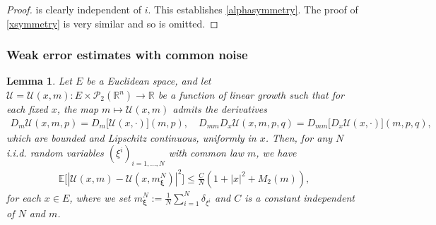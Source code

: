 \documentclass[11pt,reqno]{amsart}
\numberwithin{equation}{section}
\newtheorem{lemma}[theorem]{Lemma}
\theoremstyle{definition}
\def\E{{\mathbb E}}
\def\R{{\mathbb R}}
\newcommand{\sP}{\mathcal{P}}
\newcommand\cU{\mathcal U}
\def \E{\mathbb{E}}
\def \R{\mathbb{R}}
\begin{document}
\begin{proof}
is clearly independent of $i$.
 This establishes \eqref{alphasymmetry}. The proof of \eqref{xsymmetry} is very similar and so is omitted. 
\end{proof}



\subsubsection{Weak error estimates with common noise}

\begin{lemma} \label{lem:errorterms}
  Let $E$ be a Euclidean space, and let $\cU = \cU(x,m) : E \times \sP_2(\R^n)\to \R$ be a function of linear growth such that for each fixed $x$, the map $m\mapsto \cU(x,m)$ admits the derivatives
  \begin{align*}
  D_m \cU(x,m,p) = D_m\big[\cU(x,\cdot)](m,p), \quad D_{mm} D_x \cU(x,m,p,q) = D_{mm} \big[D_x \cU(x,\cdot)\big](m,p,q), 
\end{align*}
which are bounded and Lipschitz continuous, uniformly in $x$.
Then, for any $N$ i.i.d. random variables $(\xi^i)_{i = 1,\dots,N}$  with common law $m$,  we have
\begin{align*}
  \E\big[|\cU(x,m) - \cU(x,m_{\bm \xi}^N)|^2\big] \leq \frac{C}{N}(1 + |x|^2 + M_2(m)), 
\end{align*}
for each $x\in E$, where we set $m_{\bm \xi}^N := \frac{1}{N} \sum_{i = 1}^N \delta_{\xi^i}$ and $C$ is a constant independent of $N$ and $m$.
\end{lemma}
\end{document}
